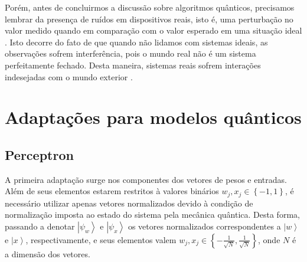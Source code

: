 Porém, antes de concluirmos a discussão sobre algoritmos quânticos, precisamos lembrar da presença de ruídos em dispositivos reais, isto é, uma perturbação no valor medido quando em comparação com o valor esperado em uma situação ideal . Isto decorre do fato de que quando não lidamos com sistemas ideais, as observações sofrem interferência, pois o mundo real não é um sistema perfeitamente fechado. Desta maneira, sistemas reais sofrem interações indesejadas com o mundo exterior \cite{nielsen2000quantum}. 

\section{Adaptações para modelos quânticos}

\subsection{Perceptron}

A primeira adaptação surge nos componentes dos vetores de pesos e entradas. Além de seus elementos estarem restritos à valores binários $w_j,x_j \in \left\{ -1,1\right\} $,  é necessário utilizar apenas vetores normalizados devido à condição de normalização imposta ao estado do sistema pela mecânica quântica. Desta forma, passando a denotar $\left|\psi_{w}\right\rangle$  e $\left|\psi_{x}\right\rangle $ os vetores normalizados correspondentes a $\left| w \right\rangle$ e $\left|x\right\rangle $, respectivamente, e seus elementos valem $w_{j},x_{j}\in\left\{ -\frac{1}{\sqrt{N}},\frac{1}{\sqrt{N}}\right\} $, onde $N$ é a dimensão dos vetores.

